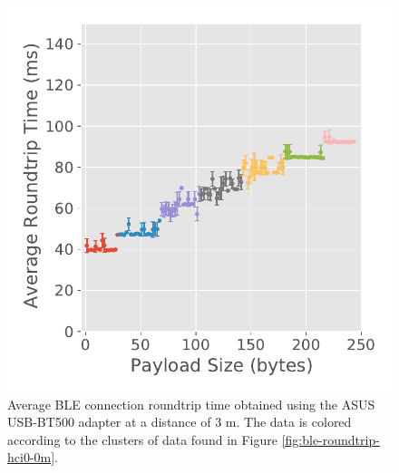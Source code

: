 \begin{figure}[H]
\begin{minipage}{0.45\linewidth}
        \includegraphics[width=\linewidth]{images/ble-roundtrip-hci0-300cm.pdf}
        \caption[Average \acs{BLE} connection roundtrip time obtained using the ASUS USB-BT500 adapter at a distance of 3 m.]{Average \acs{BLE} connection roundtrip time obtained using the ASUS USB-BT500 adapter at a distance of $3\text{ m}$. The data is colored according to the clusters of data found in Figure \ref{fig:ble-roundtrip-hci0-0m}.}
        \label{fig:ble-roundtrip-hci0-3m}
    \end{minipage}
\end{figure}

